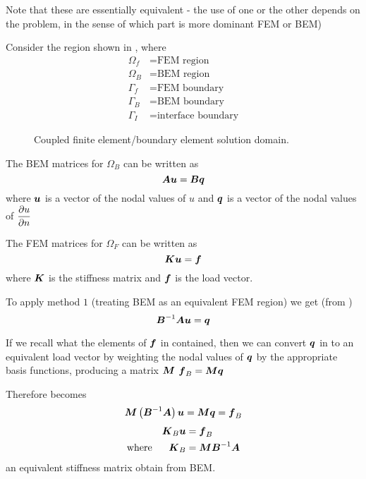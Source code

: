 Note that these are essentially equivalent - the use of one or the other
depends on the problem, in the sense of which part is more dominant FEM or
BEM)

Consider the region shown in , where
\begin{align*}
  \Omega_{f} &= \text{FEM region}\\ \Omega_{B} &= \text{BEM region}\\ 
  \Gamma_{f} &= \text{FEM boundary}\\ \Gamma_{B} &= \text{BEM
    boundary}\\ \Gamma_{I} &= \text{interface boundary}
\end{align*}
\begin{figure} \centering
  
  \caption{Coupled finite element/boundary element solution domain.}
  \label{fig:region}
\end{figure}
The BEM matrices for $\Omega_{B}$ can be written as
\begin{equation}
  \matr{A}\vect{u} = \matr{B}\vect{q}
  \label{eqn:BEM matrices}
\end{equation}
where $\vect{u}$ is a vector of the nodal values of $u$ and $\vect{q}$ is a vector
of the nodal values of $ \dfrac{\partial u}{\partial n} $

The FEM matrices for $\Omega_{F}$ can be written as
\begin{equation}
  \matr{K}\vect{u} = \vect{f}
  \label{eqn:FEM matrices}
\end{equation}
where $\matr{K}$ is the stiffness matrix and $\vect{f}$ is the load vector.  

To apply method $1$ (\ie treating BEM as an equivalent FEM region) we get (from
)
\begin{equation}
  \matr{B}^{-1}\matr{A}\vect{u}=\vect{q}
  \label{eqn:appliedmethod}
\end{equation}

If we recall what the elements of $\vect{f}$ in 
contained, then we can convert $\vect{q}$ in  to an
equivalent load vector by weighting the nodal values of $\vect{q}$ by the
appropriate basis functions, producing a matrix $\matr{M}$ \ie 
$\vect{f}_{B}=\matr{M}\vect{q}$

Therefore  becomes 
\begin{equation*}
  \matr{M}\pbrac{\matr{B}^{-1}\matr{A}}\vect{u}=  \matr{M}\vect{q} = \vect{f}_{B}
\end{equation*}
\ie 
\begin{alignat*}{2}
    && \matr{K}_{B}\vect{u} &= \vect{f}_{B} \\
    \text{where} && \matr{K}_{B} &= \matr{M}\matr{B}^{-1}\matr{A}
\end{alignat*}
an equivalent stiffness matrix obtain from BEM.

